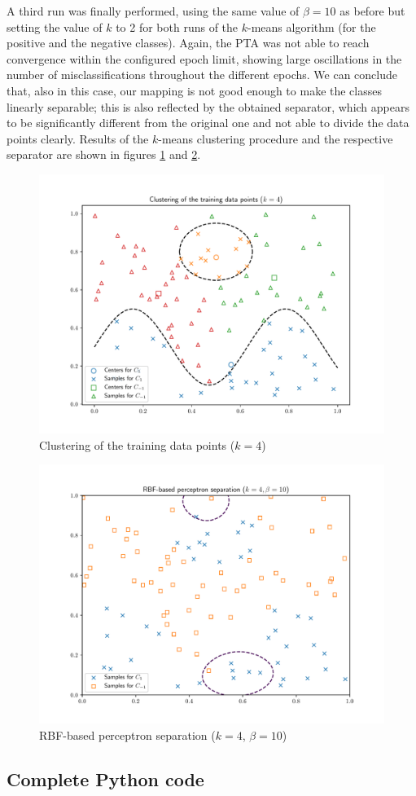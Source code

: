 \documentclass[letterpaper,headings=standardclasses]{scrartcl}
\begin{document}
A third run was finally performed, using the same value of $\beta = 10$ as before but setting the value of $k$ to 2 for both runs of the $k$-means algorithm (for the positive and the negative classes). Again, the PTA was not able to reach convergence within the configured epoch limit, showing large oscillations in the number of misclassifications throughout the different epochs. We can conclude that, also in this case, our mapping is not good enough to make the classes linearly separable; this is also reflected by the obtained separator, which appears to be significantly different from the original one and not able to divide the data points clearly. Results of the $k$-means clustering procedure and the respective separator are shown in figures \ref{data_4} and \ref{sep_4_10}.

\begin{figure}[h]
    \centering
    \includegraphics[width=0.7\linewidth]{data_4.pdf}
    \caption{Clustering of the training data points ($k = 4$)}
    \label{data_4}
\end{figure}

\begin{figure}[h]
    \centering
    \includegraphics[width=0.7\linewidth]{sep_4_10.pdf}
    \caption{RBF-based perceptron separation ($k = 4$, $\beta = 10$)}
    \label{sep_4_10}
\end{figure}

\subsection{Complete Python code}


\end{document}
